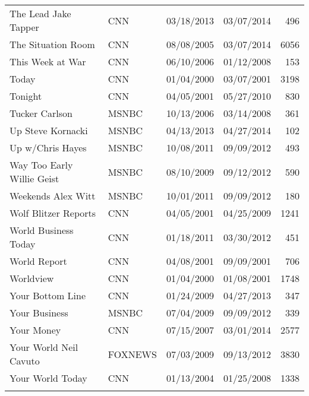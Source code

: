 {\begin{longtable}{llllr}
  The Lead Jake Tapper & CNN & 03/18/2013 & 03/07/2014 & 496 \\ 
  The Situation Room & CNN & 08/08/2005 & 03/07/2014 & 6056 \\ 
  This Week at War & CNN & 06/10/2006 & 01/12/2008 & 153 \\ 
  Today & CNN & 01/04/2000 & 03/07/2001 & 3198 \\ 
  Tonight & CNN & 04/05/2001 & 05/27/2010 & 830 \\ 
  Tucker Carlson & MSNBC & 10/13/2006 & 03/14/2008 & 361 \\ 
  Up Steve Kornacki & MSNBC & 04/13/2013 & 04/27/2014 & 102 \\ 
  Up w/Chris Hayes & MSNBC & 10/08/2011 & 09/09/2012 & 493 \\ 
  Way Too Early Willie Geist & MSNBC & 08/10/2009 & 09/12/2012 & 590 \\ 
  Weekends Alex Witt & MSNBC & 10/01/2011 & 09/09/2012 & 180 \\ 
  Wolf Blitzer Reports & CNN & 04/05/2001 & 04/25/2009 & 1241 \\ 
  World Business Today & CNN & 01/18/2011 & 03/30/2012 & 451 \\ 
  World Report & CNN & 04/08/2001 & 09/09/2001 & 706 \\ 
  Worldview & CNN & 01/04/2000 & 01/08/2001 & 1748 \\ 
  Your Bottom Line & CNN & 01/24/2009 & 04/27/2013 & 347 \\ 
  Your Business & MSNBC & 07/04/2009 & 09/09/2012 & 339 \\ 
  Your Money & CNN & 07/15/2007 & 03/01/2014 & 2577 \\ 
  Your World Neil Cavuto & FOXNEWS & 07/03/2009 & 09/13/2012 & 3830 \\ 
  Your World Today & CNN & 01/13/2004 & 01/25/2008 & 1338 \\ 
   \hline
\hline
\label{datatable}
\end{longtable}
}
